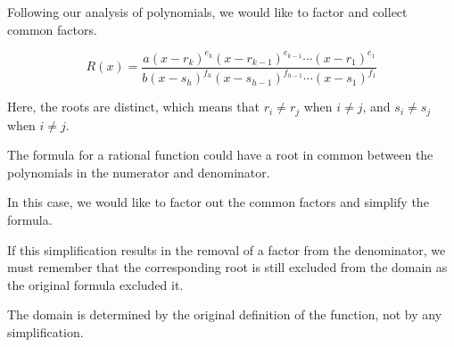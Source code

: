 \documentclass{ximera}
\begin{document}
Following our analysis of polynomials, we would like to factor and collect common factors.


\[  R(x)  = \frac{a (x - r_k)^{e_k} (x - r_{k-1})^{e_{k-1}} \cdots (x - r_1)^{e_1} }{b (x - s_h)^{f_h} (x - s_{h-1})^{f_{h-1}} \cdots (x - s_1)^{f_1}}            \]


Here, the roots are distinct, which means that  $r_i \ne r_j$ when $i \ne j$, and $s_i \ne s_j$ when $i \ne j$.



\begin{warning}  

The formula for a rational function could have a root in common between the polynomials in the numerator and denominator.

In this case, we would like to factor out the common factors and simplify the formula.

If this simplification results in the removal of a factor from the denominator, we must remember that the corresponding root is still excluded from the domain as the original formula excluded it.

The domain is determined by the original definition of the function, not by any simplification.

\end{warning}
\end{document}
